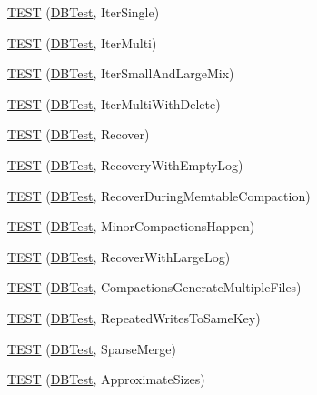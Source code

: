 \begin{DoxyCompactItemize}
\item 
\mbox{\hyperlink{namespaceleveldb_a8a6d5f729259c0f357f4dee533a5ce6a}{T\+E\+ST}} (\mbox{\hyperlink{classleveldb_1_1_d_b_test}{D\+B\+Test}}, Iter\+Single)
\item 
\mbox{\hyperlink{namespaceleveldb_a683bc77ccfd830fbe21a91c26ac91347}{T\+E\+ST}} (\mbox{\hyperlink{classleveldb_1_1_d_b_test}{D\+B\+Test}}, Iter\+Multi)
\item 
\mbox{\hyperlink{namespaceleveldb_a4044ccda7237640864995a0885ea6710}{T\+E\+ST}} (\mbox{\hyperlink{classleveldb_1_1_d_b_test}{D\+B\+Test}}, Iter\+Small\+And\+Large\+Mix)
\item 
\mbox{\hyperlink{namespaceleveldb_a3e41cdc91355438f57b9497b01c66e24}{T\+E\+ST}} (\mbox{\hyperlink{classleveldb_1_1_d_b_test}{D\+B\+Test}}, Iter\+Multi\+With\+Delete)
\item 
\mbox{\hyperlink{namespaceleveldb_ab1872cabf2fb215814f9a6f1bacacc80}{T\+E\+ST}} (\mbox{\hyperlink{classleveldb_1_1_d_b_test}{D\+B\+Test}}, Recover)
\item 
\mbox{\hyperlink{namespaceleveldb_a890ebffd31d77bc8acb760088d70ee8c}{T\+E\+ST}} (\mbox{\hyperlink{classleveldb_1_1_d_b_test}{D\+B\+Test}}, Recovery\+With\+Empty\+Log)
\item 
\mbox{\hyperlink{namespaceleveldb_a2e24806457c57e7dec22e3c05e46a82c}{T\+E\+ST}} (\mbox{\hyperlink{classleveldb_1_1_d_b_test}{D\+B\+Test}}, Recover\+During\+Memtable\+Compaction)
\item 
\mbox{\hyperlink{namespaceleveldb_a1ff90ae7b19ecf46c5efb6e5af00fa0a}{T\+E\+ST}} (\mbox{\hyperlink{classleveldb_1_1_d_b_test}{D\+B\+Test}}, Minor\+Compactions\+Happen)
\item 
\mbox{\hyperlink{namespaceleveldb_a01bbbae1753711e8b7740ed8faa9efd6}{T\+E\+ST}} (\mbox{\hyperlink{classleveldb_1_1_d_b_test}{D\+B\+Test}}, Recover\+With\+Large\+Log)
\item 
\mbox{\hyperlink{namespaceleveldb_acd61524dbc544e8f1ca63fbdfac59791}{T\+E\+ST}} (\mbox{\hyperlink{classleveldb_1_1_d_b_test}{D\+B\+Test}}, Compactions\+Generate\+Multiple\+Files)
\item 
\mbox{\hyperlink{namespaceleveldb_acb51ac2eb77bd1af22372748f9fb44da}{T\+E\+ST}} (\mbox{\hyperlink{classleveldb_1_1_d_b_test}{D\+B\+Test}}, Repeated\+Writes\+To\+Same\+Key)
\item 
\mbox{\hyperlink{namespaceleveldb_a0ed510b8c03c1ca0216ffee81199d79e}{T\+E\+ST}} (\mbox{\hyperlink{classleveldb_1_1_d_b_test}{D\+B\+Test}}, Sparse\+Merge)
\item 
\mbox{\hyperlink{namespaceleveldb_a6b3f1122dc9d727f0c699ed3da2d6474}{T\+E\+ST}} (\mbox{\hyperlink{classleveldb_1_1_d_b_test}{D\+B\+Test}}, Approximate\+Sizes)

\end{DoxyCompactItemize}
